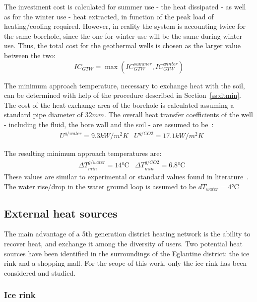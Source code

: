 \documentclass{article}
\begin{document}
The investment cost is calculated for summer use - the heat dissipated - as well as for the winter use - heat extracted, in function of the peak load of heating/cooling required. However, in reality the system is accounting twice for the same borehole, since the one for winter use will be the same during winter use. Thus, the total cost for the geothermal wells is chosen as the larger value between the two:
\begin{equation}
IC_{GTW} = 	\max \left( IC_{GTW}^{summer}, IC_{GTW}^{winter} \right) 
\end{equation}

The minimum approach temperature, necessary to exchange heat with the soil, can be determined with help of the procedure described in Section~\ref{ss:dtmin}. 
The cost of the heat exchange area of the borehole is calculated assuming a standard pipe diameter of $32 mm$\cite{siaSIA384Sondes2010, kruseStatusDevelopmentResearch2010}.
The overall heat transfer coefficients of the well - including the fluid, the bore wall and the soil - are assumed to be~\cite{kruseStatusDevelopmentResearch2010}:
\begin{align}
	& U^{g/water} = 9.3 kW/m^2K
	& U^{g/CO2} = 17.1 kW/m^2K
\end{align}

The resulting minimum approach temperatures are:
\begin{align}
	&\Delta T_{min}^{g/water} = 14 \si{\celsius}
	&\Delta T_{min}^{g/CO2} = 6.8 \si{\celsius}
\end{align}
These values are similar to experimental or standard values found in literature~\cite{siaSIA384Sondes2010, lamarcheReviewMethodsEvaluate2010}.\\

The water rise/drop in the water ground loop is assumed to be $dT_{water} = 4 \si{\celsius}$~\cite{siaSIA384Sondes2010}\\


\subsection{External heat sources}
The main advantage of a 5th generation district heating network is the ability to recover heat, and exchange it among the diversity of users. 
Two potential heat sources have been identified in the surroundings of the Eglantine district: the ice rink and a shopping mall. For the scope of this work, only the ice rink has been considered and studied.

\subsubsection{Ice rink}
\end{document}
